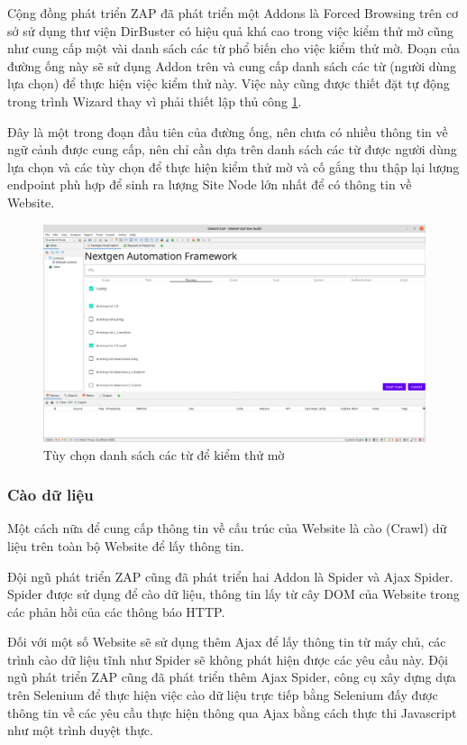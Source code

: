 \documentclass[./../main.tex]{subfiles}
\begin{document}
Cộng đồng phát triển ZAP đã phát triển một Addons là Forced Browsing trên
cơ sở sử dụng thư viện DirBuster có hiệu quả khá cao trong việc kiểm thử mờ
cũng như cung cấp một vài danh sách các từ phổ biến cho việc kiểm thử mờ.
Đoạn của đường ống này sẽ sử dụng Addon trên và cung cấp danh sách các từ
(người dùng lựa chọn) để thực hiện việc kiểm thử này. Việc này cũng được
thiết đặt tự động trong trình Wizard thay vì phải thiết lập thủ công \ref{fig:fuzz}.

Đây là một trong đoạn đầu tiên của đường ống, nên chưa có nhiều thông tin
về ngữ cảnh được cung cấp, nên chỉ cần dựa trên danh sách các từ được người
dùng  lựa chọn và các tùy chọn để thực hiện kiểm thử mờ và cố gắng thu thập
lại lượng endpoint phù hợp để sinh ra lượng Site Node lớn nhất để có
thông tin về Website.

\begin{figure}[h!]
	\includegraphics[width=\linewidth]{./images/fuzz.png}
	\caption{Tùy chọn danh sách các từ để kiểm thử mờ}
	\label{fig:fuzz}
\end{figure}

\subsubsection{Cào dữ liệu}

Một cách nữa để cung cấp thông tin về cấu trúc của Website là
cào (Crawl) dữ liệu trên toàn bộ Website để lấy thông tin.

Đội ngũ phát triển ZAP cũng đã phát triển hai Addon là Spider và
Ajax Spider. Spider được sử dụng để cào dữ liệu, thông tin lấy từ cây
DOM của Website trong các phản hồi của các thông báo HTTP.

Đối với một số Website sẽ sử dụng thêm Ajax để lấy thông tin từ máy
chủ, các trình cào dữ liệu tĩnh như Spider sẽ không phát hiện được các yêu cầu này.
Đội ngũ phát triển ZAP cũng đã phát triển thêm Ajax Spider, công cụ xây
dựng dựa trên Selenium để thực hiện việc cào dữ liệu trực tiếp bằng
Selenium đấy được thông tin về các yêu cầu thực hiện thông qua Ajax
bằng cách thực thi Javascript như một trình duyệt thực.
\end{document}
